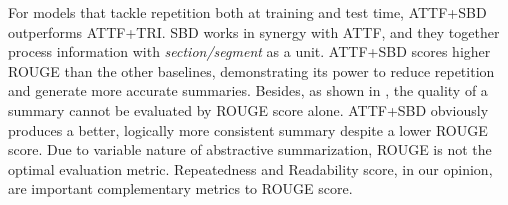 For models that tackle repetition both at training and test time, 
ATTF+SBD outperforms ATTF+TRI.
SBD works in synergy with ATTF, and they together process 
information with \textit{section/segment} as a unit.
ATTF+SBD scores higher ROUGE than the other baselines, 
demonstrating its power to  reduce 
repetition and generate more accurate summaries.
Besides, as shown in , the quality of a summary cannot be evaluated by
ROUGE score alone.
ATTF+SBD obviously produces a better, logically more consistent summary despite 
a lower ROUGE score.  
Due to variable nature of abstractive summarization, ROUGE is
not the optimal evaluation metric.
Repeatedness and Readability score, 
in our opinion, are important complementary metrics to ROUGE score.  


